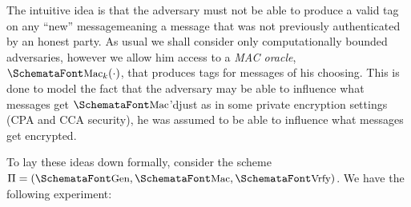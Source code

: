   \bigskip

   The intuitive idea is that the adversary must not be able to produce a valid tag on any ``new'' message\emd meaning a message that was not previously authenticated by an honest party. As usual we shall consider only computationally bounded adversaries, however we allow him access to a \emph{MAC oracle}, $\myemph{Mac}_k(\cdot)$, that produces tags for messages of his choosing. This is done to model the fact that the adversary may be able to influence what messages get $\myemph{Mac}$'d\emd just as in some private encryption settings (CPA and CCA security), he was assumed to be able to influence what messages get encrypted. 

  To lay these ideas down formally, consider the scheme $\Pi = (\myemph{Gen}, \myemph{Mac}, \myemph{Vrfy})$. We have the following experiment:

  \bigskip

